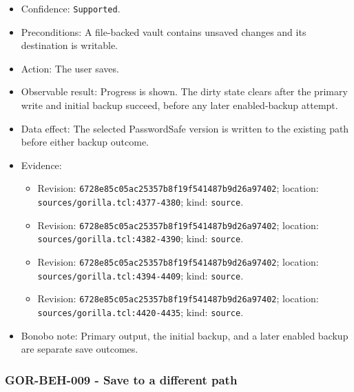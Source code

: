 \documentclass[
  letterpaper,
]{article}
\newcommand{\passthrough}[1]{#1}
\providecommand{\tightlist}{%
  \setlength{\itemsep}{0pt}\setlength{\parskip}{0pt}}
\begin{document}
\begin{itemize}
\tightlist
\item
  Confidence: \passthrough{\lstinline!Supported!}.
\item
  Preconditions: A file-backed vault contains unsaved changes and its destination is writable.
\item
  Action: The user saves.
\item
  Observable result: Progress is shown. The dirty state clears after the primary write and initial backup succeed,
  before any later enabled-backup attempt.
\item
  Data effect: The selected PasswordSafe version is written to the existing path before either backup outcome.
\item
  Evidence:

  \begin{itemize}
  \tightlist
  \item
    Revision: \nolinkurl{6728e85c05ac25357b8f19f541487b9d26a97402}; location: \nolinkurl{sources/gorilla.tcl:4377-4380};
    kind: \passthrough{\lstinline!source!}.
  \item
    Revision: \nolinkurl{6728e85c05ac25357b8f19f541487b9d26a97402}; location: \nolinkurl{sources/gorilla.tcl:4382-4390};
    kind: \passthrough{\lstinline!source!}.
  \item
    Revision: \nolinkurl{6728e85c05ac25357b8f19f541487b9d26a97402}; location: \nolinkurl{sources/gorilla.tcl:4394-4409};
    kind: \passthrough{\lstinline!source!}.
  \item
    Revision: \nolinkurl{6728e85c05ac25357b8f19f541487b9d26a97402}; location: \nolinkurl{sources/gorilla.tcl:4420-4435};
    kind: \passthrough{\lstinline!source!}.
  \end{itemize}
\item
  Bonobo note: Primary output, the initial backup, and a later enabled backup are separate save outcomes.
\end{itemize}

\subsubsection{GOR-BEH-009 - Save to a different path}\label{gor-beh-009---save-to-a-different-path}
\end{document}
